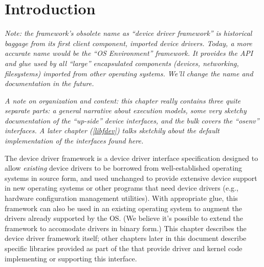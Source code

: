 %
% 
%

\label{dev}

\section{Introduction}

\emph{Note: the framework's obsolete name as
``device driver framework'' is historical baggage from its first
client component, imported device drivers.  Today, a more accurate
name would be the ``OS Environment'' framework.  It provides the API
and glue used by all ``large'' encapsulated components (devices, networking,
filesystems) imported from other operating systems.  We'll change the
name and documentation in the future.
}

\emph{A note on organization and content:
this chapter really contains three quite separate parts: a general
narrative about execution models, some very sketchy documentation of
the ``up-side'' device interfaces, and the bulk covers the ``osenv''
interfaces.  A later chapter (\ref{libfdev}) talks sketchily about the
default implementation of the interfaces found here.
}



The \oskit{} device driver framework
is a device driver interface specification 
designed to allow \emph{existing} device drivers 
to be borrowed from well-established operating systems
in source form,
and used unchanged to provide extensive device support
in new operating systems or other programs that need device drivers
(e.g., hardware configuration management utilities).
With appropriate glue,
this framework can also be used in an existing operating system
to augment the drivers already supported by the OS.
(We believe it's possible to extend the framework to
accomodate drivers in binary form.)
This chapter describes the device driver framework itself;
other chapters later in this document describe
specific libraries provided as part of the \oskit{}
that provide driver and kernel code implementing or supporting this interface.

